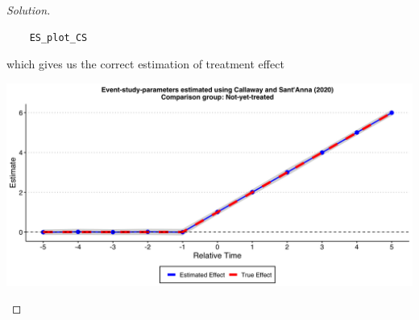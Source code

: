 \documentclass[11pt]{article}
\newenvironment{solution}{%
  \renewcommand\qedsymbol{$\blacksquare$}%
  \begin{mdframed}[backgroundcolor=gray!15]%
  \begin{proof}[Solution]}%
  {\end{proof}%
  \end{mdframed}}%
\begin{document}
\begin{enumerate}
\begin{solution}
\begin{lstlisting}
    ES_plot_CS
                \end{lstlisting}

            which gives us the correct estimation of treatment effect

            \begin{center}
                \includegraphics[scale = 0.25]{Q5c_TWFE.png}
            \end{center}

            \end{solution}

    \end{enumerate}
\end{document}

